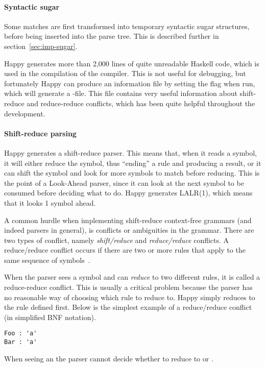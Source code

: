 \paragraph{Syntactic sugar}
Some matches are first transformed into temporary syntactic sugar structures, before being inserted into the parse tree. This is described further in section~\ref{sec:imp-sugar}.

Happy generates more than 2,000 lines of quite unreadable Haskell code, which is used in the compilation of the compiler. This is not useful for debugging, but fortunately Happy can produce an information file by setting the  flag when run, which will generate a -file. This file contains very useful information about shift-reduce and reduce-reduce conflicts, which has been quite helpful throughout the development.

\paragraph{Shift-reduce parsing}
Happy generates a shift-reduce parser. This means that, when it reads a symbol, it will either reduce the symbol, thus ``ending'' a rule and producing a result, or it can shift the symbol and look for more symbols to match before reducing. This is the point of a Look-Ahead parser, since it can look at the next symbol to be consumed before deciding what to do. Happy generates LALR(1), which means that it looks 1 symbol ahead.

A common hurdle when implementing shift-reduce context-free grammars (and indeed parsers in general), is conflicts or ambiguities in the grammar. There are two types of conflict, namely \emph{shift/reduce} and \emph{reduce/reduce} conflicts. A reduce/reduce conflict occurs if there are two or more rules that apply to the same sequence of symbols~\cite[sec. 5.6]{bison13}.

When the parser sees a symbol and can \emph{reduce} to two different rules, it is called a reduce-reduce conflict. This is usually a critical problem because the parser has no reasonable way of choosing which rule to reduce to. Happy simply reduces to the rule defined first. Below is the simplest example of a reduce/reduce conflict (in simplified BNF notation).

\begin{lstlisting}
Foo : 'a'
Bar : 'a'
\end{lstlisting}

When seeing an  the parser cannot decide whether to reduce to  or .

